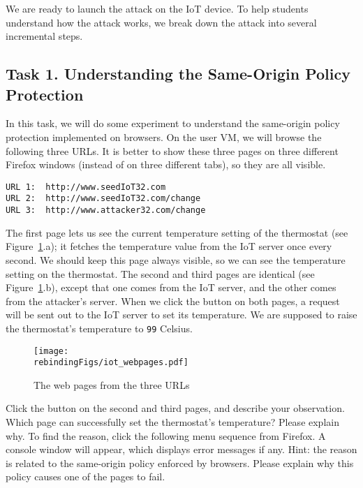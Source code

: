We are ready to launch the attack on the IoT device. To help students 
understand how the attack works, we break down
the attack into several incremental steps. 


\subsection{Task 1. Understanding the Same-Origin Policy Protection}

In this task, we will do some experiment to understand the 
same-origin policy protection implemented on browsers. On the user VM,
we will browse the following three URLs. It is better to show these three pages on three
different Firefox windows (instead of on three different tabs), so they are all visible. 


\begin{lstlisting}
URL 1:  http://www.seedIoT32.com
URL 2:  http://www.seedIoT32.com/change
URL 3:  http://www.attacker32.com/change
\end{lstlisting}

 
The first page lets us see the current temperature setting of the thermostat (see
Figure~\ref{rebinding:fig:webpages}.a); it fetches
the temperature value from the IoT server once every second. We should keep this page always
visible, so we can see the temperature setting on the thermostat. 
The second and third pages
are identical (see Figure~\ref{rebinding:fig:webpages}.b), 
except that one comes from the IoT server, and the other comes from
the attacker's server. When we click the button on both pages, 
a request will be sent out to the IoT server to set its temperature. 
We are supposed to raise the thermostat's temperature 
to \texttt{99} Celsius.  


\begin{figure}[htb]
\begin{center}
\texttt{[image: \\rebindingFigs/iot\_webpages.pdf]}
\end{center}
\caption{The web pages from the three URLs}
\label{rebinding:fig:webpages}
\end{figure}
 

Click the button on the second and third pages, and describe your observation. Which page
can successfully set the thermostat's temperature? Please explain why. 
To find the reason, click the following menu sequence from Firefox. A console window will appear,
which displays error messages if any. Hint: the reason is related to the same-origin policy 
enforced by browsers. Please explain why this policy causes one of the pages to fail.
 
